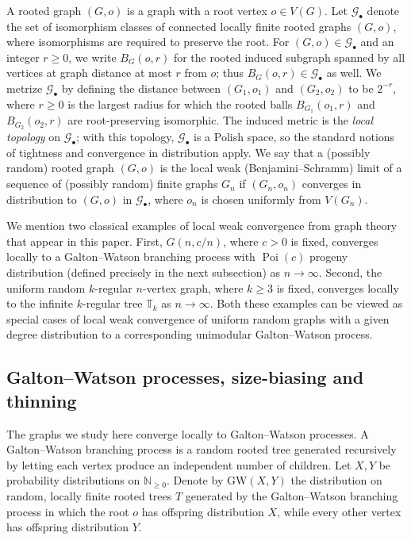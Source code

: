 \documentclass[10pt,a4paper]{amsart}
\numberwithin{equation}{section}
\newcommand{\N}{\mathbb N}
\newcommand{\bbT}{\mathbb T}
\newcommand{\cG}{\mathcal G}
\begin{document}
A rooted graph $(G,o)$ is a graph with a root vertex $o\in V(G)$. Let $\cG_\bullet$ denote the set of isomorphism classes of connected locally finite rooted graphs $(G,o)$, 
where isomorphisms are required to preserve the root. 
For $(G,o)\in\cG_\bullet$ and an integer $r\ge 0$, we write $B_G(o,r)$ for the rooted induced subgraph spanned by all vertices 
at graph distance at most $r$ from $o$; thus $B_G(o,r)\in\cG_\bullet$ as well. We metrize $\cG_\bullet$ by defining 
the distance between $(G_1,o_1)$ and $(G_2,o_2)$ to be $2^{-r}$, where $r\ge 0$ is the largest radius for which the 
rooted balls $B_{G_1}(o_1,r)$ and $B_{G_2}(o_2,r)$ are root-preserving isomorphic. The induced metric is the 
{\em local topology} on $\cG_\bullet$; with this topology, $\cG_\bullet$ is a Polish space, so the standard notions of tightness and convergence in distribution apply.
We say that a (possibly random) rooted graph $(G,o)$ is the local weak (Benjamini--Schramm) limit of a sequence of (possibly random) finite graphs $G_n$ if $(G_n,o_n)$ 
converges in distribution to $(G,o)$ in $\cG_\bullet$, where $o_n$ is chosen uniformly from $V(G_n)$.

We mention two classical examples of local weak convergence from graph theory that appear in this paper. First, $G(n,c/n)$, where $c>0$ is fixed, converges locally to a 
Galton--Watson branching process with $\operatorname{Poi}(c)$ progeny distribution (defined precisely in the next subsection) as $n\to\infty$. 
Second, the uniform random $k$-regular $n$-vertex graph, where $k\ge 3$ is fixed, converges locally to the infinite $k$-regular tree $\bbT_k$ as $n\to\infty$. 
Both these examples can be viewed as special cases of local weak convergence of uniform random graphs with a given degree distribution 
to a corresponding unimodular Galton--Watson process.

\subsection{Galton--Watson processes, size-biasing and thinning}
The graphs we study here converge locally to Galton--Watson processes. 
A Galton--Watson branching process is a random rooted tree generated recursively by letting each vertex produce an independent number of children.  
Let $X,Y$ be probability distributions on $\N_{\ge 0}$. Denote by $\mathrm{GW}(X,Y)$ the distribution on random, locally finite rooted trees $T$ generated 
by the Galton--Watson branching process in which the root $o$ has offspring distribution $X$, while every other vertex has offspring distribution $Y$. 
\end{document}
